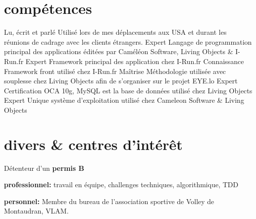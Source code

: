 \documentclass{friggeri-cv} 	%
\begin{document}
\section{compétences}

\begin{capabilitize}
		{Lu, écrit et parlé}
		{Utilisé lors de mes déplacements aux USA et durant les réunions de cadrage avec les clients
		étrangers.}
		{Expert}
		{Langage de programmation principal des applications éditées par Caméléon Software, Living Objects \& I-Run.fr}
		{Expert}
		{Framework principal des application chez I-Run.fr}
		{Connaissance}
		{Framework front utilisé chez I-Run.fr}
		{Maîtrise}
		{Méthodologie utilisée avec souplesse chez Living Objects afin de s’organiser sur le projet EYE.lo}
		{Expert}
		{Certification OCA 10g, MySQL est la base de données utilisé chez Living Objects}
		{Expert}
		{Unique système d’exploitation utilisé chez Cameleon Software \& Living Objects}
\end{capabilitize}


\section{divers \& centres d’intérêt}

Détenteur d’un \textbf{permis B}

\textbf{professionnel:} travail en équipe, challenges techniques, algorithmique, TDD

\textbf{personnel:} Membre du bureau de l’association sportive de Volley de Montaudran, VLAM.
\end{document}

